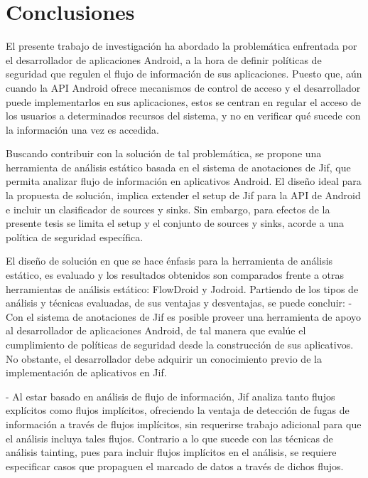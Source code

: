 \section{Conclusiones}
El presente trabajo de investigación ha abordado la problemática enfrentada por
el desarrollador de aplicaciones Android, a la hora de definir políticas de
seguridad que regulen el flujo de información de sus aplicaciones. Puesto que,
aún cuando la API Android ofrece mecanismos de control de acceso y el
desarrollador puede implementarlos en sus aplicaciones, estos se centran en
regular el acceso de los usuarios a determinados recursos del sistema, y no en
verificar qué sucede con la información una vez es accedida.

Buscando contribuir con la solución de tal problemática, se propone una
herramienta de análisis estático basada en el sistema de anotaciones de Jif, que
permita analizar flujo de información en aplicativos Android. El diseño ideal
para la propuesta de solución, implica extender el setup de Jif para la API de
Android e incluir un clasificador de sources y sinks. Sin embargo, para efectos
de la presente tesis se limita el setup y el conjunto de sources y sinks, acorde
a una política de seguridad específica.

El diseño de solución en que se hace énfasis para la herramienta de análisis
estático, es evaluado y los resultados obtenidos son comparados frente a otras
herramientas de análisis estático: FlowDroid y Jodroid. Partiendo de los tipos
de análisis y técnicas evaluadas, de sus ventajas y desventajas, se
puede concluir:\newline 
- Con el sistema de anotaciones de Jif es posible proveer una
herramienta de apoyo al desarrollador de aplicaciones Android, de tal manera que evalúe el
cumplimiento de políticas de seguridad desde la construcción de sus aplicativos.\\
No obstante, el desarrollador debe adquirir un conocimiento previo de la
implementación de aplicativos en Jif.

- Al estar basado en análisis de flujo de información, Jif analiza tanto flujos
explícitos como flujos implícitos, ofreciendo la ventaja de detección de fugas
de información a través de flujos implícitos, sin requerirse trabajo adicional
para que el análisis incluya tales flujos. Contrario a lo que sucede con las
técnicas de análisis tainting, pues para incluir flujos implícitos en el
análisis, se requiere especificar casos que propaguen el marcado de datos a
través de dichos flujos.

